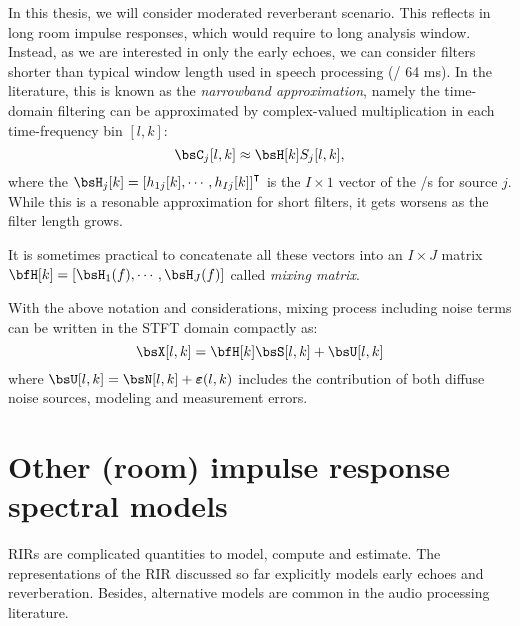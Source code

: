 \mynewline
In this thesis, we will consider moderated reverberant scenario.
This reflects in long room impulse responses, which would require to long analysis window.
Instead, as we are interested in only the early echoes, we can consider filters shorter than typical window length used in speech processing (\eg/ 64 ms).
In the literature, this is known as the \textit{narrowband approximation}, namely the time-domain filtering can be approximated by complex-valued multiplication in each time-frequency bin $[l,k]$:
\begin{equation}\label{eq:processing:narrow}
    \IMGS_j[l,k] \approx {\FLTS}[k] \SRC_j[l,k]
    ,
\end{equation}
where the ${\FLTS}_j[k] = \ktranspose{\klist{{\flt}_{1j}[k], \cdots, {\flt}_{Ij}[k]}}$ is the $I \times 1$ vector of the \RTF/s for source $j$.
While this is a resonable approximation for short filters, it gets worsens as the filter length grows.

It is sometimes practical to concatenate all these vectors into an $I \times J$ matrix ${\FLTSS}[k] = \klist{\FLTS_1(f),\cdots,\FLTS_J(f)}$ called \textit{mixing matrix}.

\mynewline
With the above notation and considerations, mixing process including noise terms can be written in the \ac{STFT} domain compactly as:
\begin{equation}\label{eq:processing:model:stfs}
    \MICS[l,k] = \FLTSS[k] \SRCS[l,k] + \bsU[l,k]
\end{equation}
where $\bsU[l,k] = \bsN[l,k] + \boldsymbol{\varepsilon}(l,k)$ includes the contribution of both diffuse noise sources, modeling and measurement errors.



\section{Other (room) impulse response spectral models}\label{sec:processing:rirmodels}
\acp{RIR} are complicated quantities to model, compute and estimate.
The representations of the \ac{RIR} discussed so far explicitly models early echoes and reverberation.
Besides, alternative models are common in the audio processing literature.

